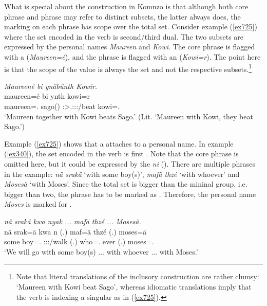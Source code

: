 What is special about the  construction in Komnzo is that although both core phrase and  phrase may refer to distinct subsets, the latter always does, the  marking on each phrase has scope over the total set. Consider example (\ref{ex725}) where the set encoded in the verb is second/third dual. The two subsets are expressed by the personal names \emph{Maureen} and \emph{Kowi}. The core phrase is flagged with a   (\emph{Maureen=é}), and the  phrase is flagged with an   (\emph{Kowi=r}). The point here is that the scope of the  value is always the set and not the respective subsets.\footnote{Note that literal translations of the inclusory construction are rather clumsy: `Maureen with Kowi beat Sago', whereas idiomatic  translations imply that the verb is indexing a singular as in (\ref{ex725}).}

\begin{exe}
	\ex \emph{Maureené bi ynäbünth Kowir.}\\
	\gll maureen=é bi ynth kowi=r\\
	maureen=\Erg.\Nsg{} sago(\Abs) \Stdu:\Sbj>\Tsg.\Masc:\Obj:\Nonpast:\Ipfv/beat kowi=\Assoc.\Du{}\\
	\trans `Maureen together with Kowi beats Sago.' (Lit. `Maureen with Kowi, they beat Sago.')
	\label{ex725}
\end{exe}

Example (\ref{ex725}) shows that a  attaches to a personal name. In example (\ref{ex340}), the set encoded in the verb is first . Note that the core phrase is omitted here, but it could be expressed by the  \emph{ni} (\Fnsg). There are multiple  phrases in the example: \emph{nä srakä} `with some boy(s)', \emph{mafä thzé} `with whoever' and \emph{Mosesä} `with Moses'. Since the total set is bigger than the mininal group, i.e. bigger than two, the  phrase has to be marked as . Therefore, the personal name \emph{Moses} is marked for .

\begin{exe}
	\ex \emph{nä srakä kwa nyak ... mafä thzé ... Mosesä.}\\
	\gll nä srak=ä kwa n (.) maf=ä thzé (.) moses=ä\\
	some boy=\Assoc.\Pl{} \Fut{} \Fpl:\Sbj:\Nonpast:\Ipfv/walk (.) who=\Assoc.\Pl{} ever (.) moses=\Assoc.\Pl\\
	\trans `We will go with some boy(s) ... with whoever ... with Moses.'
	\label{ex340}
\end{exe}

